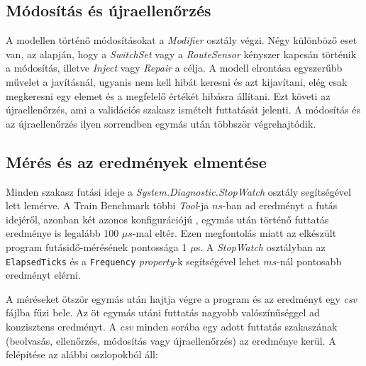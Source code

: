 \subsection{Módosítás és újraellenőrzés}

A modellen történő módosításokat a \emph{Modifier} osztály végzi. Négy különböző eset van, az alapján, hogy a \emph{SwitchSet} vagy a \emph{RouteSensor} kényszer kapcsán történik a módosítás, illetve \emph{Inject} vagy \emph{Repair} a célja. A modell elrontása egyszerűbb művelet a javításnál, ugyanis nem kell hibát keresni és azt kijavítani, elég csak megkeresni egy elemet és a megfelelő értékét hibásra állítani. Ezt követi az újraellenőrzés, ami a validációs szakasz ismételt futtatását jelenti. A módosítás és az újraellenőrzés ilyen sorrendben egymás után többször végrehajtódik.

\subsection{Mérés és az eredmények elmentése}

Minden szakasz futási ideje a \emph{System.Diagnostic.StopWatch} osztály segítségével lett lemérve. A Train Benchmark többi \emph{Tool}-ja $ns$-ban ad eredményt a futás idejéről, azonban két azonos konfigurációjú , egymás után történő futtatás eredménye is legalább 100 $\mu{}s$-mal eltér. Ezen megfontolás miatt az elkészült program futásidő-mérésének pontossága 1 $\mu{}$s. A \emph{StopWatch} osztályban az \texttt{ElapsedTicks} és a \texttt{Frequency} \emph{property}-k segítségével lehet $ms$-nál pontosabb eredményt elérni.

A méréseket ötször egymás után hajtja végre a program és az eredményt egy \emph{csv} fájlba fűzi bele. Az öt egymás utáni futtatás nagyobb valószínűséggel ad konzisztens eredményt. A \emph{csv} minden sorába egy adott futtatás szakaszának (beolvasás, ellenőrzés, módosítás vagy újraellenőrzés) az eredménye kerül. A felépítése az alábbi oszlopokból áll:

